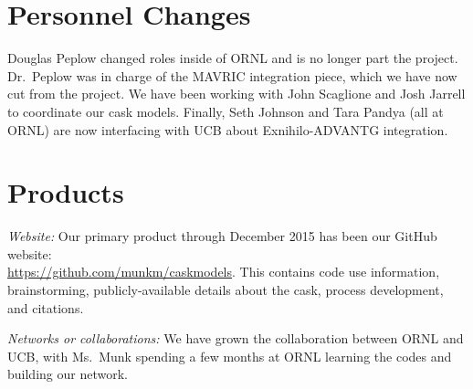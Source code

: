 \documentclass[12pt]{article}
\begin{document}
\section{Personnel Changes}
\label{sect::personnel}

Douglas Peplow changed roles inside of ORNL and is no longer part the project. Dr.\ Peplow was in charge of the MAVRIC integration piece, which we have now cut from the project. We have been working with John Scaglione and Josh Jarrell to coordinate our cask models. Finally, Seth Johnson and Tara Pandya (all at ORNL) are now interfacing with UCB about Exnihilo-ADVANTG integration.


\section{Products}
\label{sect::products}
\textit{Website:} Our primary product through December 2015 has been our GitHub website: \\\href{https://github.com/munkm/caskmodels}{https://github.com/munkm/caskmodels}. This contains code use information, brainstorming, publicly-available details about the cask, process development, and citations. 

\textit{Networks or collaborations:} We have grown the collaboration between ORNL and UCB, with Ms.\ Munk spending a few months at ORNL learning the codes and building our network.
\end{document}
